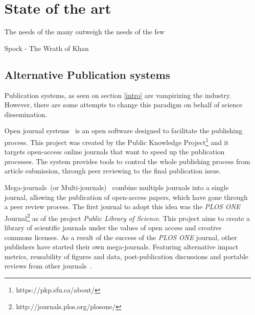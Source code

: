 \chapter{State of the art}

\begin{FraseCelebre}
  \begin{Frase}
    The needs of the many outweigh the needs of the few
  \end{Frase}
  \begin{Fuente}
    Spock - The Wrath of Khan
  \end{Fuente}
\end{FraseCelebre}




\section{Alternative Publication systems}

Publication systems, as seen on section \ref{intro} are vampirizing the
industry. However, there are some attempts to change this paradigm on behalf
of science dissemination.

Open journal systems~\cite{willinsky2005open} is an open software designed to
facilitate the publishing process. This project was created by the Public
Knowledge Project\footnote{https://pkp.sfu.ca/about/} and it targets open-access
online journals that want to speed up the publication processes. The system
provides tools to control the whole publishing process from article submission,
through peer reviewing to the final publication issue.

Mega-journals~(or Multi-journals)~\cite{binfield2013open,wellen2013open} combine
multiple journals into a single journal, allowing the publication of open-access
papers, which have gone through a peer review process. The first journal to
adopt this idea was the \emph{PLOS ONE}
Journal\footnote{http://journals.plos.org/plosone/} as of the project
\emph{Public Library of Science}. This project aims to create a library of
scientific journals under the values of open access and creative commons
licenses. As a result of the success of the \emph{PLOS ONE} journal, other
publishers have started their own mega-journals. Featuring alternative impact
metrics, reusability of figures and data, post-publication discussions and
portable reviews from other journals~\cite{bjork2015have}.

